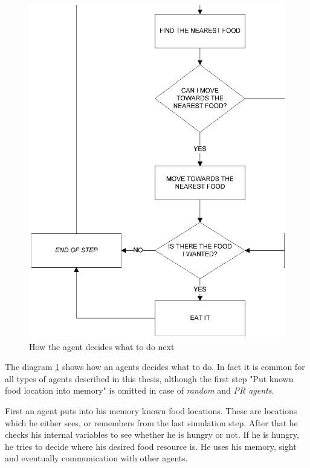 \begin{figure}
  \centering                                
  \includegraphics[scale=0.5]{diagrams/solution/decision-flowchart.eps}    
  \caption{How the agent decides what to do next}
  \label{solution:decision}
\end{figure}

The diagram \ref{solution:decision} shows how an agents decides what to do. In fact it is common for all types of agents described in this thesis, although the first step "Put known food location into memory" is omitted in case of \emph{random} and \emph{PR agents}. 

First an agent puts into his memory known food locations. These are locations which he either sees, or remembers from the last simulation step. After that he checks his internal variables to see whether he is hungry or not. If he is hungry, he tries to decide where his desired food resource is. He uses his memory, sight and eventually communication with other agents. 


